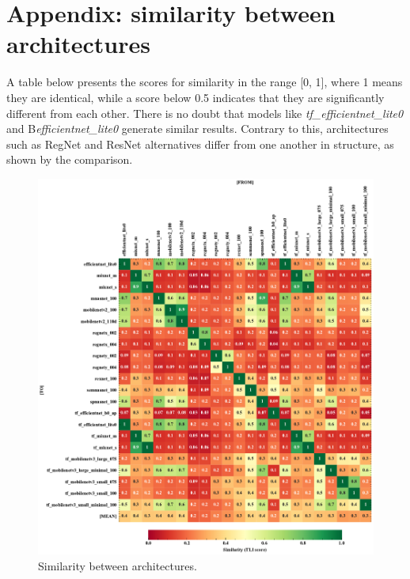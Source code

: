 \documentclass{article} %
\begin{document}




\newpage
\appendix
\section{Appendix: similarity between architectures}

A table below presents the scores for similarity in the range [0, 1], where 1 means they are identical, while a score below 0.5 indicates that they are significantly different from each other.
There is no doubt that models like \textit{tf\_efficientnet\_lite0} and B\textit{efficientnet\_lite0} generate similar results. Contrary to this, architectures such as RegNet and ResNet alternatives differ from one another in structure, as shown by the comparison.

\begin{figure}[h]
	\begin{center}
	\center\includegraphics[width=\linewidth]{figures/v1_matrix}
	\end{center}
	\caption{Similarity between architectures.}
	\label{fig:matrix}
\end{figure}
\end{document}
